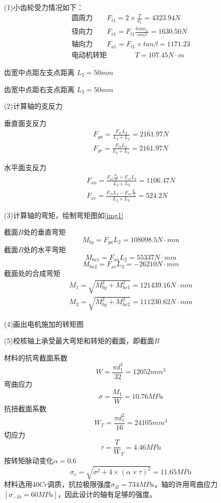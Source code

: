 (1)小齿轮受力情况如下：
\begin{align}
    \text{圆周力}       \qquad   F_{t1}=2\times \frac{T}{d_1}=4323.94N \\
    \text{径向力} \qquad          F_{r1}=F_{t1}\frac{tan\alpha_n}{cos \beta}=1630.50N\\
    \text{轴向力}       \qquad          F_{a1}=F_{t1}\times tan\beta =1171.23\\
    \text{电动机转矩} \qquad\qquad      T=107.45N\cdot m
\end{align}

齿宽中点距左支点距离 $L_2 =50mm$

齿宽中点距右支点距离 $L_3 =50mm$

(2)计算轴的支反力

垂直面支反力
\begin{align*}
    F_{ya}=\frac{F_{t1}L_3}{L_2+L_3}=2161.97N\\
    F_{yc}=\frac{F_{t1}L_2}{L_2+L_3}=2161.97N
\end{align*}

水平面支反力
\begin{align*}
    F_{xa}=\frac{F_{a1}{\frac{d_1}{2}}+F_{r1}L_3}{L_2+L_3} =1106.47N \\
    F_{xc}=\frac{F_{r1}{L_2}-F_{a1}\frac{d_1}{2}}{L_2+L_3}=524.2N
\end{align*}

(3)计算轴的弯矩，绘制弯矩图如\ref{img1}

截面$B$处的垂直弯矩
\[
    M_{by}=F_{ya}L_2=108098.5N\cdot mm
\]
截面$B$处的水平弯矩
\[
    M_{bx1}=F_{xa}L_2=55337N\cdot mm
\]
\[
    M_{bx2}=F_{xc}L_3=-26210N\cdot mm
\]
截面处的合成弯矩
\begin{align*}
    M_1=\sqrt{M_{by}^2+M_{bx1}^2}=121439.16N\cdot mm\\
    M_2=\sqrt{M_{by}^2+M_{bx2}^2}=111230.62N\cdot mm
\end{align*}

(4)画出电机施加的转矩图

(5)校核轴上承受最大弯矩和转矩的截面，即截面$B$

材料的抗弯截面系数
\[
    W=\frac{\pi d_1^2}{32}=12052mm^3
\]
弯曲应力
\[
    \sigma = \frac{M_1}{W} =10.76MPa
\]
抗扭截面系数
\[
    W_T=\frac{\pi d_1^2}{16}=24105mm^3
\]
切应力
\[
    \tau = \frac{T}{W}_T =4.46MPa
\]
按转矩脉动变化$\alpha =0.6$
\[
    \sigma_e =\sqrt{\sigma^2+4\times (\alpha \times \tau)^2}=11.65MPa
\]
材料选用$40Cr$调质，抗拉极限强度$\sigma_B=734MPa$，轴的许用弯曲应力$[\sigma_{-1b}=60MPa]$，因此设计的轴有足够的强度。   



